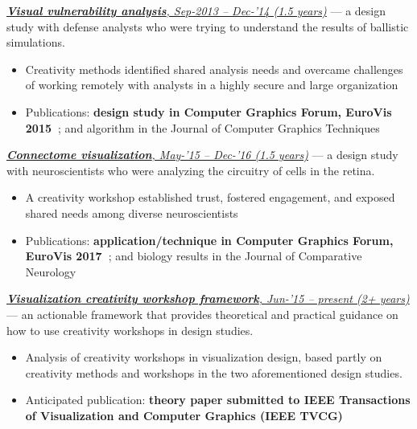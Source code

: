 \begin{todolist}
    \item[\done] \underline{\emph{{\bf Visual vulnerability analysis}, Sep-2013 -- Dec-'14 (1.5 years)}} --- a design study with defense analysts who were trying to understand the results of ballistic simulations.
    \begin{itemize}
        \item Creativity methods identified shared analysis needs and overcame challenges of working remotely with analysts in a highly secure and large organization
        \item Publications: {\bf design study in Computer Graphics Forum, EuroVis 2015~\cite{Kerzner2015}}; and algorithm in the Journal of Computer Graphics Techniques~\cite{Gribble2014}
    \end{itemize}
    
    \item[\done] \underline{\emph{{\bf Connectome visualization}, May-'15 -- Dec-'16 (1.5 years)}} --- a design study with neuroscientists who were analyzing the circuitry of cells in the retina.
    \begin{itemize}
        \item A creativity workshop established trust, fostered engagement, and exposed shared needs among diverse neuroscientists
        \item Publications: {\bf application/technique in Computer Graphics Forum, EuroVis 2017~\cite{Kerzner2017}}; and biology results in the Journal of Comparative Neurology~\cite{Lauritzen2016}
    \end{itemize}

    \item \underline{\emph{{\bf Visualization creativity workshop framework}, Jun-'15 -- present (2+ years)}} --- an actionable framework that provides theoretical and practical guidance on how to use creativity workshops in design studies.
    \begin{itemize}
        
        \item Analysis of creativity workshops in visualization design, based partly on creativity methods and workshops in the two aforementioned design studies.

        \item Anticipated publication: {\bf theory paper submitted to IEEE Transactions of Visualization and Computer Graphics (IEEE TVCG)}
    \end{itemize}
    
\end{todolist}


